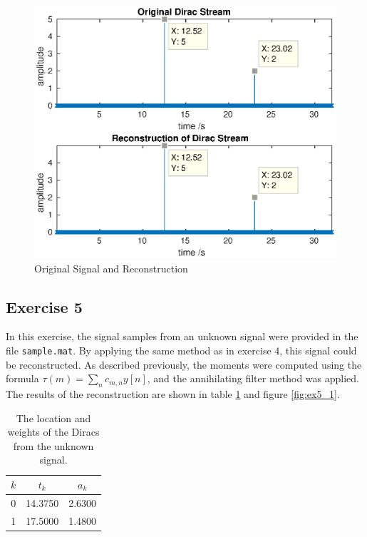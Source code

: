 \documentclass[a4paper]{article}
\begin{document}
\begin{figure}[H]
    \centering
    \includegraphics[width=\textwidth]{../images/ex4}
    \caption{Original Signal and Reconstruction}
    \label{fig:ex4_1}
\end{figure}

\subsection{Exercise 5}

In this exercise, the signal samples from an unknown signal were provided in the file \texttt{sample.mat}. By applying the same method as in exercise 4, this signal could be reconstructed. As described previously, the moments were computed using the formula $\tau(m)=\sum_nc_{m,n}y[n]$, and the annihilating filter method was applied. The results of the reconstruction are shown in table \ref{tab:ex5_1} and figure \ref{fig:ex5_1}.

\begin{table}[H]
    \centering
    \begin{tabular}{|c|c|c|}
        \hline
        $k$     & $t_k$     & $a_k$ \\ \hline
		0 & 14.3750 & 2.6300\\ \hline
        1 & 17.5000 & 1.4800 \\ \hline
    \end{tabular}
    \caption{The location and weights of the Diracs from the unknown signal.}
    \label{tab:ex5_1}
\end{table}
\end{document}
